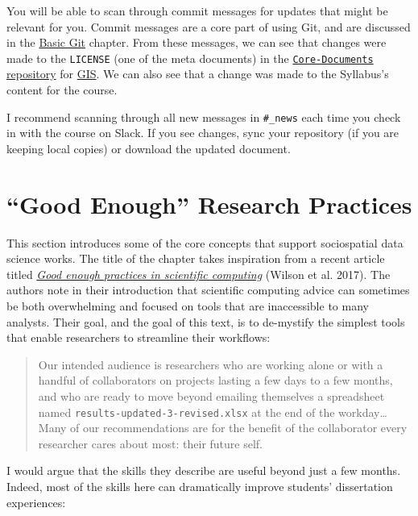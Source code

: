 \documentclass[]{book}
\theoremstyle{definition}
\theoremstyle{definition}
\theoremstyle{definition}
\theoremstyle{remark}
\begin{document}
You will be able to scan through commit messages for updates that might
be relevant for you. Commit messages are a core part of using Git, and
are discussed in the \protect\hyperlink{basic-git}{Basic Git} chapter.
From these messages, we can see that changes were made to the
\texttt{LICENSE} (one of the meta documents) in the
\href{https://github.com/slu-soc5650/Core-Documents}{\texttt{Core-Documents}
repository} for \href{https://slu-soc5650.github.io/}{GIS}. We can also
see that a change was made to the Syllabus's content for the course.

I recommend scanning through all new messages in \texttt{\#\_news} each
time you check in with the course on Slack. If you see changes, sync
your repository (if you are keeping local copies) or download the
updated document.

\hypertarget{good-enough-research-practices}{\chapter{\texorpdfstring{``Good
Enough'' Research
Practices}{Good Enough Research Practices}}\label{good-enough-research-practices}}

This section introduces some of the core concepts that support
sociospatial data science works. The title of the chapter takes
inspiration from a recent article titled
\href{http://journals.plos.org/ploscompbiol/article?id=10.1371/journal.pcbi.1005510}{\emph{Good
enough practices in scientific computing}} (Wilson et al. 2017). The
authors note in their introduction that scientific computing advice can
sometimes be both overwhelming and focused on tools that are
inaccessible to many analysts. Their goal, and the goal of this text, is
to de-mystify the simplest tools that enable researchers to streamline
their workflows:

\begin{quote}
Our intended audience is researchers who are working alone or with a
handful of collaborators on projects lasting a few days to a few months,
and who are ready to move beyond emailing themselves a spreadsheet named
\texttt{results-updated-3-revised.xlsx} at the end of the
workday\ldots{}Many of our recommendations are for the benefit of the
collaborator every researcher cares about most: their future self.
\end{quote}

I would argue that the skills they describe are useful beyond just a few
months. Indeed, most of the skills here can dramatically improve
students' dissertation experiences:
\end{document}
